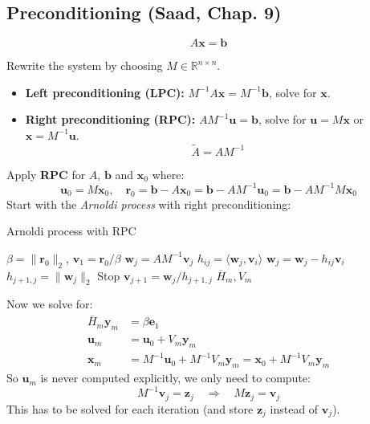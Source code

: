 \subsection{Preconditioning (Saad, Chap. 9)}

\[
    A\mathbf{x} = \mathbf{b}
\]

Rewrite the system by choosing $M \in \mathbb{R}^{n \times n}$.

\begin{itemize}
    \item \textbf{Left preconditioning (LPC):} $M^{-1} A \mathbf{x} = M^{-1} \mathbf{b}$, solve for $\mathbf{x}$.
    \item \textbf{Right preconditioning (RPC):} $A M^{-1} \mathbf{u} = \mathbf{b}$, solve for $\mathbf{u} = M \mathbf{x}$ or $\mathbf{x} = M^{-1} \mathbf{u}$.
          \[
              \tilde{A} = A M^{-1}
          \]
\end{itemize}

Apply \textbf{RPC} for $A$, $\mathbf{b}$ and $\mathbf{x}_0$ where:
\[
    \mathbf{u}_0 = M \mathbf{x}_0, \quad \mathbf{r}_0 = \mathbf{b} - A \mathbf{x}_0 = \mathbf{b} - A M^{-1} \mathbf{u}_0 = \mathbf{b} - A M^{-1}M \mathbf{x}_0
\]
Start with the \emph{Arnoldi process} with right preconditioning:
\begin{algorithm}[H]
    \caption{Arnoldi process with RPC}
    \label{alg:arnoldi_rpc}
    \begin{algorithmic}
        \State $\beta = \|\mathbf{r}_0\|_2$, $\mathbf{v}_1 = \mathbf{r}_0 / \beta$
        \State $\mathbf{w}_j = A M^{-1} \mathbf{v}_j$
        \State $h_{ij} = \langle \mathbf{w}_j, \mathbf{v}_i \rangle$
        \State $\mathbf{w}_j = \mathbf{w}_j - h_{ij} \mathbf{v}_i$
        \EndFor
        \State $h_{j+1,j} = \|\mathbf{w}_j\|_2$
        \State Stop
        \EndIf
        \State $\mathbf{v}_{j+1} = \mathbf{w}_j / h_{j+1,j}$
        \Return $\overline{H}_m, V_m$
    \end{algorithmic}
\end{algorithm}

Now we solve for:
\begin{align*}
    \overline{H}_m \mathbf{y}_m & = \beta \mathbf{e}_1 \tag{Least squares problem}                                         \\
    \mathbf{u}_m                & = \mathbf{u}_0 + V_m \mathbf{y}_m                                                        \\
    \mathbf{x}_m                & = M^{-1} \mathbf{u}_0 + M^{-1} V_m \mathbf{y}_m = \mathbf{x}_0 + M^{-1} V_m \mathbf{y}_m
\end{align*}
So $\mathbf{u}_m$ is never computed explicitly, we only need to compute:
\[
    M^{-1} \mathbf{v}_j = \mathbf{z}_j \quad \Rightarrow \quad M \mathbf{z}_j = \mathbf{v}_j
\]
This has to be solved for each iteration (and store $\mathbf{z}_j$ instead of $\mathbf{v}_j$).

